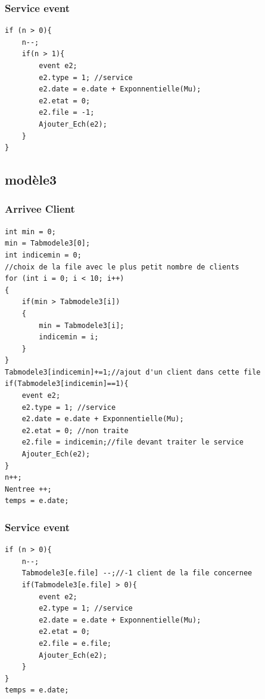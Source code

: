 \documentclass[a4paper,11pt]{article}
\begin{document}
		\subsubsection{Service event}
			\begin{lstlisting}
if (n > 0){
	n--;
	if(n > 1){
		event e2;
		e2.type = 1; //service
		e2.date = e.date + Exponnentielle(Mu);
		e2.etat = 0;
		e2.file = -1;
		Ajouter_Ech(e2);
	}
}
			\end{lstlisting}
	\subsection{modèle3}
		\subsubsection{Arrivee Client}
			\begin{lstlisting}
int min = 0;
min = Tabmodele3[0];
int indicemin = 0;
//choix de la file avec le plus petit nombre de clients
for (int i = 0; i < 10; i++)
{
	if(min > Tabmodele3[i])
	{
		min = Tabmodele3[i];
		indicemin = i;
	}
}
Tabmodele3[indicemin]+=1;//ajout d'un client dans cette file
if(Tabmodele3[indicemin]==1){
	event e2;
	e2.type = 1; //service
	e2.date = e.date + Exponnentielle(Mu);
	e2.etat = 0; //non traite
	e2.file = indicemin;//file devant traiter le service
	Ajouter_Ech(e2);
}
n++;
Nentree ++;
temps = e.date;
			\end{lstlisting}
		\subsubsection{Service event}
			\begin{lstlisting}
if (n > 0){
	n--;
	Tabmodele3[e.file] --;//-1 client de la file concernee 
	if(Tabmodele3[e.file] > 0){
		event e2;
		e2.type = 1; //service
		e2.date = e.date + Exponnentielle(Mu);
		e2.etat = 0;
		e2.file = e.file;
		Ajouter_Ech(e2);
	}
}
temps = e.date;
			\end{lstlisting}
\end{document}
